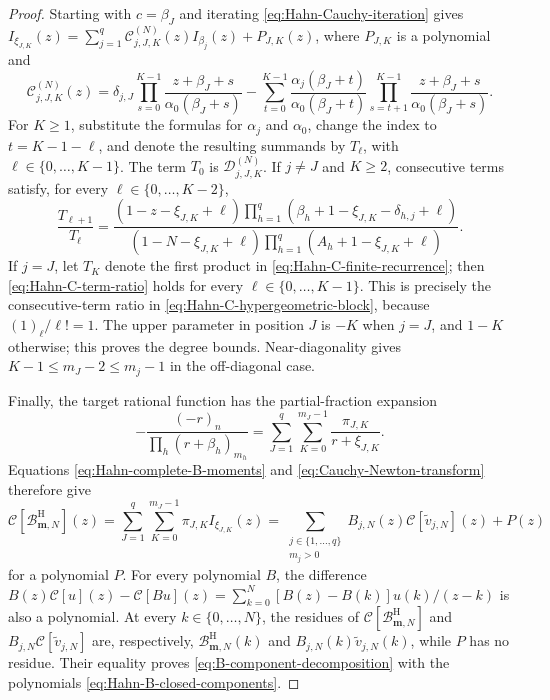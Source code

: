 \documentclass[10pt]{amsart}
\newcommand{\mm}{\boldsymbol m}
\theoremstyle{plain}
\theoremstyle{definition}
\theoremstyle{remark}
\begin{document}
\begin{proof}
Starting with \(c=\beta_J\) and iterating
\eqref{eq:Hahn-Cauchy-iteration} gives
\(I_{\xi_{J,K}}(z)=
\sum_{j=1}^q\mathcal C_{j,J,K}^{(N)}(z)I_{\beta_j}(z)
+P_{J,K}(z)\),
where \(P_{J,K}\) is a polynomial and
\begin{equation}
 \mathcal C_{j,J,K}^{(N)}(z)=
 \delta_{j,J}\prod_{s=0}^{K-1}
 \frac{z+\beta_J+s}{\alpha_0(\beta_J+s)}-\sum_{t=0}^{K-1}
 \frac{\alpha_j(\beta_J+t)}{\alpha_0(\beta_J+t)}
 \prod_{s=t+1}^{K-1}
 \frac{z+\beta_J+s}{\alpha_0(\beta_J+s)}.
 \label{eq:Hahn-C-finite-recurrence}
\end{equation}
For \(K\ge1\), substitute the formulas for \(\alpha_j\) and
\(\alpha_0\), change the index to \(t=K-1-\ell\), and denote the
resulting summands by \(T_\ell\), with
\(\ell\in\{0,\ldots,K-1\}\). The term \(T_0\) is
\(\mathcal D_{j,J,K}^{(N)}\). If \(j\ne J\) and \(K\ge2\), consecutive
terms satisfy, for every \(\ell\in\{0,\ldots,K-2\}\),
\begin{equation}
 \frac{T_{\ell+1}}{T_\ell}=
 \frac{(1-z-\xi_{J,K}+\ell)
 \prod_{h=1}^q(\beta_h+1-\xi_{J,K}-\delta_{h,j}+\ell)}
 {(1-N-\xi_{J,K}+\ell)
 \prod_{h=1}^q(A_h+1-\xi_{J,K}+\ell)}.
 \label{eq:Hahn-C-term-ratio}
\end{equation}
If \(j=J\), let \(T_K\) denote the first product in
\eqref{eq:Hahn-C-finite-recurrence}; then
\eqref{eq:Hahn-C-term-ratio} holds for every
\(\ell\in\{0,\ldots,K-1\}\). This is precisely the consecutive-term
ratio in \eqref{eq:Hahn-C-hypergeometric-block}, because
\((1)_\ell/\ell!=1\). The upper parameter
in position \(J\) is \(-K\) when \(j=J\), and \(1-K\) otherwise; this
proves the degree bounds. Near-diagonality gives
\(K-1\le m_J-2\le m_j-1\) in the off-diagonal case.

Finally, the target rational function has the partial-fraction expansion
\[
 -\frac{(-r)_n}{\prod_h(r+\beta_h)_{m_h}}
 =\sum_{J=1}^q\sum_{K=0}^{m_J-1}
 \frac{\pi_{J,K}}{r+\xi_{J,K}}.
\]
Equations \eqref{eq:Hahn-complete-B-moments} and
\eqref{eq:Cauchy-Newton-transform} therefore give
\[
 \mathscr C[\mathcal B_{\mm,N}^{\mathrm H}](z)
 =\sum_{J=1}^q\sum_{K=0}^{m_J-1}
 \pi_{J,K}I_{\xi_{J,K}}(z)
 =\sum_{\substack{j\in\{1,\ldots,q\}\\m_j>0}}
 B_{j,N}(z)\mathscr C[\widetilde v_{j,N}](z)+P(z)
\]
for a polynomial \(P\). For every polynomial \(B\), the difference
\(B(z)\mathscr C[u](z)-\mathscr C[Bu](z)
=\sum_{k=0}^N[B(z)-B(k)]u(k)/(z-k)\) is also a polynomial. At every
\(k\in\{0,\ldots,N\}\), the residues of
\(\mathscr C[\mathcal B_{\mm,N}^{\mathrm H}]\) and
\(B_{j,N}\mathscr C[\widetilde v_{j,N}]\) are, respectively,
\(\mathcal B_{\mm,N}^{\mathrm H}(k)\) and
\(B_{j,N}(k)\widetilde v_{j,N}(k)\), while \(P\) has no residue.
Their equality proves \eqref{eq:B-component-decomposition} with the
polynomials \eqref{eq:Hahn-B-closed-components}.
\end{proof}
\end{document}
